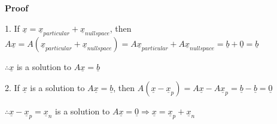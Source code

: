 \documentclass[12pt,a4paper]{article}
\begin{document}
\textbf{Proof} 

1. If $\underline{x} = \underline{x}_{particular} + \underline{x}_{nullspace}$, then 
$A\underline{x} = A(\underline{x}_{particular} + \underline{x}_{nullspace}) = A\underline{x}_{particular} + A\underline{x}_{nullspace} = \underline{b} + \underline{0} = \underline{b}$

$\therefore \underline{x}$ is a solution to $A\underline{x} = \underline{b}$

2. If $\underline{x}$ is a solution to $A\underline{x} = \underline{b}$, then
$A(\underline{x} - \underline{x}_p) = A\underline{x} - A\underline{x}_p = \underline{b} - \underline{b} = \underline{0}$

$\therefore \underline{x} - \underline{x}_p = \underline{x}_n$ is a solution to $A\underline{x} = \underline{0} \Rightarrow \underline{x} = \underline{x}_p + \underline{x}_n$
\end{document}
